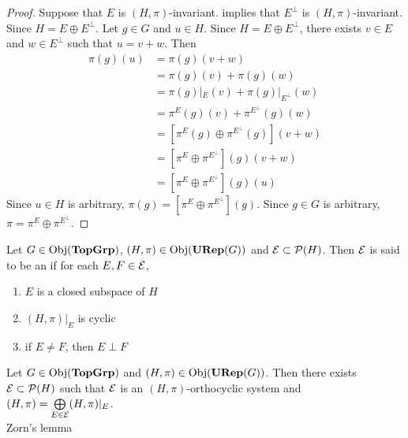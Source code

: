 \documentclass{book}
\begin{document}
	\begin{proof}
		Suppose that  $E$ is $(H, \pi)$-invariant.  implies that $E^{\perp}$ is $(H, \pi)$-invariant. Since $H = E \oplus E^{\perp}$. Let $g \in G$ and $u \in H$. Since $H = E \oplus E^{\perp}$, there exists $v \in E$ and $w \in E^{\perp}$ such that $u = v + w$. Then  
		\begin{align*}
			\pi(g)(u)
			& = \pi(g)(v +w) \\
			& = \pi(g)(v) + \pi(g)(w) \\
			& = \pi(g)|_E(v) + \pi(g)|_{E^{\perp}}(w) \\
			& = \pi^E(g)(v) + \pi^{E^{\perp}}(g)(w) \\
			& = [\pi^E(g) \oplus \pi^{E^{\perp}}(g)](v+w) \\
			& = [\pi^E \oplus \pi^{E^{\perp}}](g)(v+w) \\
			& = [\pi^E \oplus \pi^{E^{\perp}}](g)(u)
		\end{align*}
		Since $u \in H$ is arbitrary, $\pi(g) = [\pi^E \oplus \pi^{E^{\perp}}](g)$. Since $g \in G$ is arbitrary, $\pi = \pi^E \oplus \pi^{E^\perp}$.
	\end{proof}
	
	
	\begin{defn}
		Let $G \in \operatorname{Obj}(\operatorname*{\text{\textbf{TopGrp}}})$, $(H, \pi) \in \operatorname{Obj}(\operatorname*{\text{\textbf{URep}}}(G))$ and $\mathcal{E} \subset \mathcal{P}(H)$. Then $\mathcal{E}$ is said to be an  if for each $E, F \in \mathcal{E}$,
		\begin{enumerate}
			\item $E$ is a closed subspace of $H$
			\item $(H, \pi)|_E$ is cyclic
			\item if $E \neq F$, then $E \perp F$
		\end{enumerate}
	\end{defn}
	
	\begin{ex}
		Let $G \in \operatorname{Obj}(\operatorname*{\text{\textbf{TopGrp}}})$ and $(H, \pi) \in \operatorname{Obj}(\operatorname*{\text{\textbf{URep}}}(G))$. Then there exists $\mathcal{E} \subset \mathcal{P}(H)$ such that $\mathcal{E}$ is an $(H, \pi)$-orthocyclic system and $(H, \pi) =  \bigoplus\limits_{E \in \mathcal{E}} (H, \pi)|_E $. \\
		 Zorn's lemma
	\end{ex}
	
	
	
\end{document}

